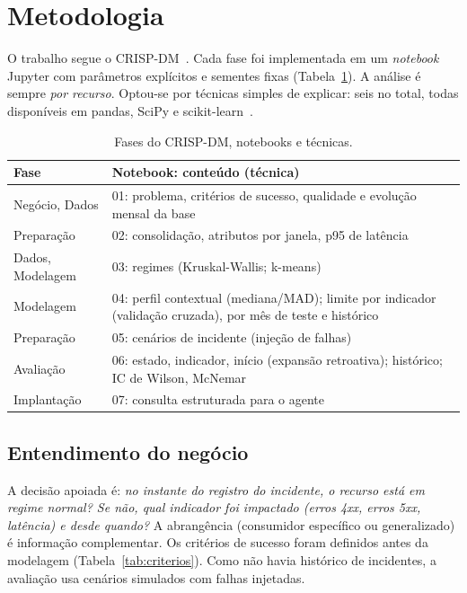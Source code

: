 \documentclass[sigconf,nonacm]{acmart}
\begin{document}
\section{Metodologia}\label{sec:metodologia}

O trabalho segue o CRISP-DM~\citep{wirth2000crispdm,chapman2000crispdm}. Cada fase foi implementada em um \emph{notebook} Jupyter com parâmetros explícitos e sementes fixas (Tabela~\ref{tab:fases}). A análise é sempre \emph{por recurso}. Optou-se por técnicas simples de explicar: seis no total, todas disponíveis em pandas, SciPy e scikit-learn~\citep{pedregosa2011sklearn}.

\begin{table}[t]
  \caption{Fases do CRISP-DM, notebooks e técnicas.}
  \label{tab:fases}
  \small
  \begin{tabular}{p{}p{}}
    \toprule
    Fase & Notebook: conteúdo (técnica) \\
    \midrule
    Negócio, Dados & 01: problema, critérios de sucesso, qualidade e evolução mensal da base \\
    Preparação & 02: consolidação, atributos por janela, p95 de latência \\
    Dados, Modelagem & 03: regimes (Kruskal-Wallis; k-means) \\
    Modelagem & 04: perfil contextual (mediana/MAD); limite por indicador (validação cruzada), por mês de teste e histórico \\
    Preparação & 05: cenários de incidente (injeção de falhas) \\
    Avaliação & 06: estado, indicador, início (expansão retroativa); histórico; IC de Wilson, McNemar \\
    Implantação & 07: consulta estruturada para o agente \\
    \bottomrule
  \end{tabular}
\end{table}

\subsection{Entendimento do negócio}
A decisão apoiada é: \emph{no instante do registro do incidente, o recurso está em regime normal? Se não, qual indicador foi impactado (erros 4xx, erros 5xx, latência) e desde quando?} A abrangência (consumidor específico ou generalizado) é informação complementar. Os critérios de sucesso foram definidos antes da modelagem (Tabela~\ref{tab:criterios}). Como não havia histórico de incidentes, a avaliação usa cenários simulados com falhas injetadas.
\end{document}
